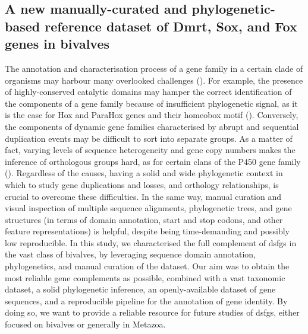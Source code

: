\documentclass[../main.tex]{subfiles}
\begin{document}
\subsection{A new manually-curated and phylogenetic-based reference dataset of Dmrt, Sox, and Fox genes in bivalves}
The annotation and characterisation process of a gene family in a certain clade of organisms may harbour many overlooked challenges (\textbf{\cite{vizueta2020bitacora}}). For example, the presence of highly-conserved catalytic domains may hamper the correct identification of the components of a gene family because of insufficient phylogenetic signal, as it is the case for Hox and ParaHox genes and their homeobox motif (\textbf{\cite{baldwin2018new, nicolini2023comparative}}). Conversely, the components of dynamic gene families characterised by abrupt and sequential duplication events may be difficult to sort into separate groups. As a matter of fact, varying levels of sequence heterogeneity and gene copy numbers makes the inference of orthologous groups hard, as for certain clans of the P450 gene family (\textbf{\cite{dermauw2020diversity}}). Regardless of the causes, having a solid and wide phylogenetic context in which to study gene duplications and losses, and orthology relationships, is crucial to overcome these difficulties. In the same way, manual curation and visual inspection of multiple sequence alignments, phylogenetic trees, and gene structures (in terms of domain annotation, start and stop codons, and other feature representations) is helpful, despite being time-demanding and possibly low reproducible. In this study, we characterised the full complement of \glspl{dsfg} in the vast class of bivalves, by leveraging sequence domain annotation, phylogenetics, and manual curation of the dataset. Our aim was to obtain the most reliable gene complements as possible, combined with a vast taxonomic dataset, a solid phylogenetic inference, an openly-available dataset of gene sequences, and a reproducible pipeline for the annotation of gene identity. By doing so, we want to provide a reliable resource for future studies of \glspl{dsfg}, either focused on bivalves or generally in Metazoa.
\end{document}
